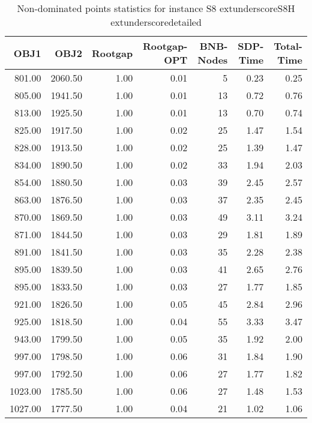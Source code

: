 \begin{table}
\caption{Non-dominated points statistics for instance S8	extunderscoreS8H	extunderscoredetailed}
\label{tab:stats/S8_S8H_detailed}
\begin{tabular}{rrrrrrr}
\toprule
OBJ1 & OBJ2 & Rootgap & Rootgap-OPT & BNB-Nodes & SDP-Time & Total-Time \\
\midrule
801.00 & 2060.50 & 1.00 & 0.01 & 5 & 0.23 & 0.25 \\
805.00 & 1941.50 & 1.00 & 0.01 & 13 & 0.72 & 0.76 \\
813.00 & 1925.50 & 1.00 & 0.01 & 13 & 0.70 & 0.74 \\
825.00 & 1917.50 & 1.00 & 0.02 & 25 & 1.47 & 1.54 \\
828.00 & 1913.50 & 1.00 & 0.02 & 25 & 1.39 & 1.47 \\
834.00 & 1890.50 & 1.00 & 0.02 & 33 & 1.94 & 2.03 \\
854.00 & 1880.50 & 1.00 & 0.03 & 39 & 2.45 & 2.57 \\
863.00 & 1876.50 & 1.00 & 0.03 & 37 & 2.35 & 2.45 \\
870.00 & 1869.50 & 1.00 & 0.03 & 49 & 3.11 & 3.24 \\
871.00 & 1844.50 & 1.00 & 0.03 & 29 & 1.81 & 1.89 \\
891.00 & 1841.50 & 1.00 & 0.03 & 35 & 2.28 & 2.38 \\
895.00 & 1839.50 & 1.00 & 0.03 & 41 & 2.65 & 2.76 \\
895.00 & 1833.50 & 1.00 & 0.03 & 27 & 1.77 & 1.85 \\
921.00 & 1826.50 & 1.00 & 0.05 & 45 & 2.84 & 2.96 \\
925.00 & 1818.50 & 1.00 & 0.04 & 55 & 3.33 & 3.47 \\
943.00 & 1799.50 & 1.00 & 0.05 & 35 & 1.92 & 2.00 \\
997.00 & 1798.50 & 1.00 & 0.06 & 31 & 1.84 & 1.90 \\
997.00 & 1792.50 & 1.00 & 0.06 & 27 & 1.77 & 1.82 \\
1023.00 & 1785.50 & 1.00 & 0.06 & 27 & 1.48 & 1.53 \\
1027.00 & 1777.50 & 1.00 & 0.04 & 21 & 1.02 & 1.06 \\
\bottomrule
\end{tabular}
\end{table}
